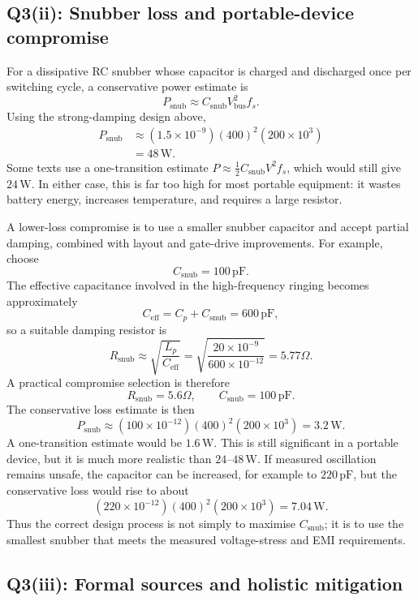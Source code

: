\documentclass[11pt,a4paper]{article}
\newcommand{\unit}[1]{\,\mathrm{#1}}
\newcommand{\answerbox}[1]{\[\boxed{#1}\]}
\begin{document}
\subsection*{Q3(ii): Snubber loss and portable-device compromise}

For a dissipative RC snubber whose capacitor is charged and discharged once per switching cycle, a conservative power estimate is
\[
P_{\mathrm{snub}}\approx C_{\mathrm{snub}}V_{\mathrm{bus}}^2f_s.
\]
Using the strong-damping design above,
\begin{align*}
P_{\mathrm{snub}}
&\approx (1.5\times10^{-9})(400)^2(200\times10^3) \\
&=48\unit{W}.
\end{align*}
Some texts use a one-transition estimate $P\approx \tfrac12 C_{\mathrm{snub}}V^2f_s$, which would still give $24\unit{W}$. In either case, this is far too high for most portable equipment: it wastes battery energy, increases temperature, and requires a large resistor.

A lower-loss compromise is to use a smaller snubber capacitor and accept partial damping, combined with layout and gate-drive improvements. For example, choose
\[
C_{\mathrm{snub}}=100\unit{pF}.
\]
The effective capacitance involved in the high-frequency ringing becomes approximately
\[
C_{\mathrm{eff}}=C_p+C_{\mathrm{snub}}=600\unit{pF},
\]
so a suitable damping resistor is
\[
R_{\mathrm{snub}}\approx\sqrt{\frac{L_p}{C_{\mathrm{eff}}}}
=\sqrt{\frac{20\times10^{-9}}{600\times10^{-12}}}
=5.77\Omega.
\]
A practical compromise selection is therefore
\answerbox{R_{\mathrm{snub}}=5.6\Omega,\qquad C_{\mathrm{snub}}=100\unit{pF}.}
The conservative loss estimate is then
\[
P_{\mathrm{snub}}\approx (100\times10^{-12})(400)^2(200\times10^3)=3.2\unit{W}.
\]
A one-transition estimate would be $1.6\unit{W}$. This is still significant in a portable device, but it is much more realistic than $24$--$48\unit{W}$. If measured oscillation remains unsafe, the capacitor can be increased, for example to $220\unit{pF}$, but the conservative loss would rise to about
\[
(220\times10^{-12})(400)^2(200\times10^3)=7.04\unit{W}.
\]
Thus the correct design process is not simply to maximise $C_{\mathrm{snub}}$; it is to use the smallest snubber that meets the measured voltage-stress and EMI requirements.

\subsection*{Q3(iii): Formal sources and holistic mitigation}
\end{document}
